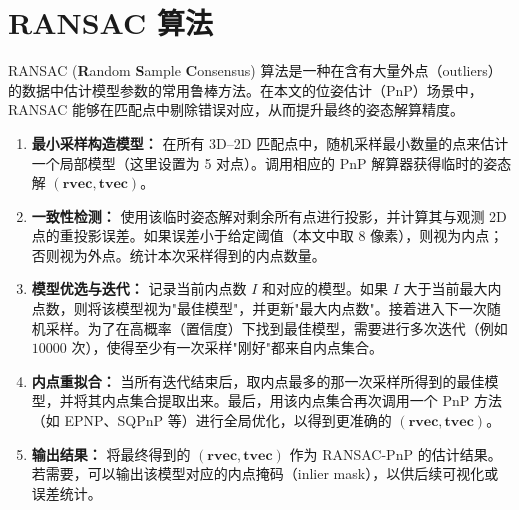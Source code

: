 \section{RANSAC 算法}
\label{sec:RANSAC-TRO-SQPnP:RANSAC}

RANSAC (\textbf{R}andom \textbf{S}ample \textbf{C}onsensus) 算法是一种在含有大量外点（outliers）的数据中估计模型参数的常用鲁棒方法。在本文的位姿估计（PnP）场景中，RANSAC 能够在匹配点中剔除错误对应，从而提升最终的姿态解算精度。

\begin{enumerate}
	\item \textbf{最小采样构造模型：}  
	在所有 3D--2D 匹配点中，随机采样最小数量的点来估计一个局部模型（这里设置为 5 对点）。调用相应的 PnP 解算器获得临时的姿态解 $(\mathbf{rvec}, \mathbf{tvec})$。
	
	\item \textbf{一致性检测：}  
	使用该临时姿态解对剩余所有点进行投影，并计算其与观测 2D 点的重投影误差。如果误差小于给定阈值（本文中取 $8$ 像素），则视为内点；否则视为外点。统计本次采样得到的内点数量。
	
	\item \textbf{模型优选与迭代：}  
	记录当前内点数 $I$ 和对应的模型。如果 $I$ 大于当前最大内点数，则将该模型视为"最佳模型"，并更新"最大内点数"。接着进入下一次随机采样。为了在高概率（置信度）下找到最佳模型，需要进行多次迭代（例如 $10000$ 次），使得至少有一次采样"刚好"都来自内点集合。
	
	\item \textbf{内点重拟合：}  
	当所有迭代结束后，取内点最多的那一次采样所得到的最佳模型，并将其内点集合提取出来。最后，用该内点集合再次调用一个 PnP 方法（如 EPNP、SQPnP 等）进行全局优化，以得到更准确的 $(\mathbf{rvec}, \mathbf{tvec})$。
	
	\item \textbf{输出结果：}  
	将最终得到的 $(\mathbf{rvec}, \mathbf{tvec})$ 作为 RANSAC-PnP 的估计结果。若需要，可以输出该模型对应的内点掩码（inlier mask），以供后续可视化或误差统计。
\end{enumerate}

